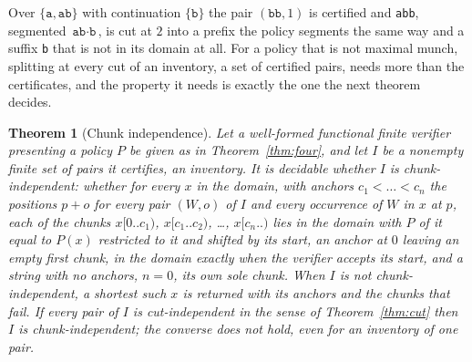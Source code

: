 \documentclass[11pt,a4paper]{article}
\theoremstyle{definition}
\theoremstyle{plain}
\newtheorem{theorem}{Theorem}
\newcommand{\code}[1]{\texttt{#1}}
\begin{document}
Over $\{\code{a}, \code{ab}\}$ with continuation $\{\code{b}\}$ the pair $(\code{bb}, 1)$ is certified and \code{abb},
segmented $\code{ab} \cdot \code{b}$, is cut at $2$ into a prefix the policy segments the same way and a suffix \code{b}
that is not in its domain at all. For a policy that is not maximal munch, splitting at every cut of an inventory, a set
of certified pairs, needs more than the certificates, and the property it needs is exactly the one the next theorem
decides.

\begin{theorem}[Chunk independence]\label{thm:chunk} Let a well-formed functional finite verifier presenting a policy
$P$ be given as in Theorem~\ref{thm:four}, and let $I$ be a nonempty finite set of pairs it certifies, an
\emph{inventory}. It is decidable whether $I$ is chunk-independent: whether for every $x$ in the domain, with anchors
$c_1 < \dots < c_n$ the positions $p + o$ for every pair $(W, o)$ of $I$ and every occurrence of $W$ in $x$ at $p$, each
of the chunks $x[0..c_1)$, $x[c_1..c_2)$, \dots, $x[c_n..)$ lies in the domain with $P$ of it equal to $P(x)$ restricted
to it and shifted by its start, an anchor at $0$ leaving an empty first chunk, in the domain exactly when the verifier
accepts its start, and a string with no anchors, $n = 0$, its own sole chunk. When $I$ is not chunk-independent, a
shortest such $x$ is returned with its anchors and the chunks that fail. If every pair of $I$ is cut-independent in the
sense of Theorem~\ref{thm:cut} then $I$ is chunk-independent; the converse does not hold, even for an inventory of one
pair.
\end{theorem}
\end{document}
